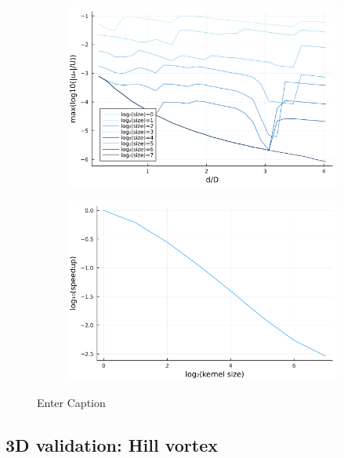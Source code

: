 \documentclass{article}
\begin{document}
\begin{figure}
    \centering
    \begin{subfigure}{.5\textwidth}
        \centering
        \includegraphics[width=\textwidth]{tex//fig/lamb_dipole_error_dists.png}
    \end{subfigure}%
    \begin{subfigure}{.5\textwidth}
        \centering
        \includegraphics[width=\textwidth]{tex/fig/lamb_dipole_speedup_dists.png}
    \end{subfigure}
    \caption{Enter Caption}
    \label{fig:error_lamb_2}
\end{figure}

\subsection{3D validation: Hill vortex}
\end{document}

